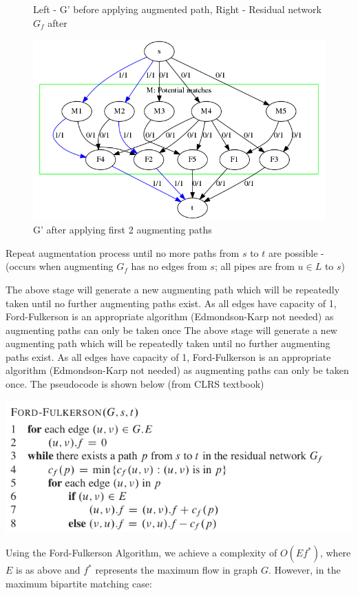 \documentclass[11pt, a4paper]{article}
\begin{document}
\begin{figure}[ht!]
\caption{Left - G' before applying augmented path, Right - Residual network
  $G_f$ after}
\includegraphics[scale=0.5]{q1matchset7.png}
\caption{G' after applying first 2 augmenting paths}
\end{figure}

Repeat augmentation process until no more paths from $s$ to $t$ are
possible - (occurs when augmenting $G_f$ has no edges from $s$; all pipes are
from $u \in L$ to $s$)

The above stage will generate a new augmenting path which will be repeatedly
taken until no further augmenting paths exist. As all edges have capacity of 1,
Ford-Fulkerson is an appropriate algorithm (Edmondson-Karp not needed) as
augmenting paths can only be taken once
The above stage will generate a new augmenting path which will be repeatedly
taken until no further augmenting paths exist. As all edges have capacity of 1,
Ford-Fulkerson is an appropriate algorithm (Edmondson-Karp not needed) as augmenting
paths can only be taken once. The pseudocode is shown below (from CLRS textbook)

\includegraphics[scale=0.5]{ffmethod.png}

Using the Ford-Fulkerson Algorithm, we achieve a complexity of $O(Ef^{*})$, where
$E$ is as above and $f^{*}$ represents the maximum flow in graph $G$.
However, in the maximum bipartite matching case: 
\end{document}
